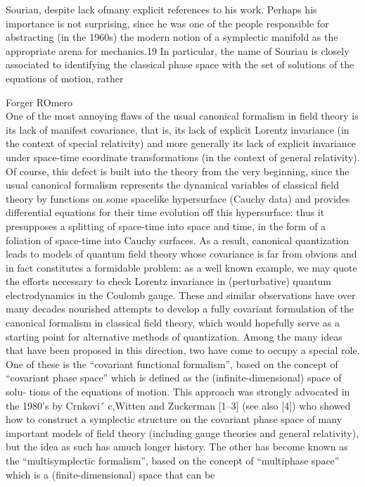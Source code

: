 \documentclass[Main]{subfiles}
\begin{document}
\begin{Warning}
Souriau, despite lack ofmany explicit references to his work. Perhaps his importance is not surprising, since he was one of the people responsible for abstracting (in the 1960s) the modern notion of a symplectic manifold as the appropriate arena for mechanics.19 In particular, the name of Souriau is closely associated to identifying the classical phase space with the set of solutions of the equations of motion, rather

\end{Warning}

\begin{Warning}
Forger ROmero\\

One of the most annoying flaws of the usual canonical formalism in field theory is its lack of manifest covariance, that is, its lack of explicit Lorentz invariance (in the context of special relativity) and more generally its lack of explicit invariance under space-time coordinate transformations (in the context of general relativity). 
Of course, this defect is built into the theory from the very beginning, since the usual canonical formalism represents the dynamical variables of classical field theory by functions on some spacelike hypersurface (Cauchy data) and provides differential equations for their time evolution off this hypersurface: thus it presupposes a splitting of space-time into space and time, in the form of a foliation of space-time into Cauchy surfaces.
As a result, canonical quantization leads to models of quantum field theory whose covariance is far from obvious and in fact constitutes a formidable problem: as a well known example, we may quote the efforts necessary to check Lorentz invariance in (perturbative) quantum electrodynamics in the Coulomb gauge. 
These and similar observations have over many decades nourished attempts to develop a fully covariant formulation of the canonical formalism in classical field theory, which would hopefully serve as a starting point for alternative methods of quantization.
Among the many ideas that have been proposed in this direction, two have come to occupy a special role. One of these is the “covariant functional formalism”, based on the concept of “covariant phase space” which is defined as the (infinite-dimensional) space of solu- tions of the equations of motion. This approach was strongly advocated in the 1980’s by Crnkovi´
c,Witten and Zuckerman [1–3] (see also [4]) who showed how to construct a symplectic structure on the covariant phase space of many important models of field theory (including gauge theories and general relativity), but the idea as such has amuch longer history. The other has become known as the “multisymplectic formalism”, based on the concept of “multiphase space” which is a (finite-dimensional) space that can be

\end{Warning}
\end{document}
